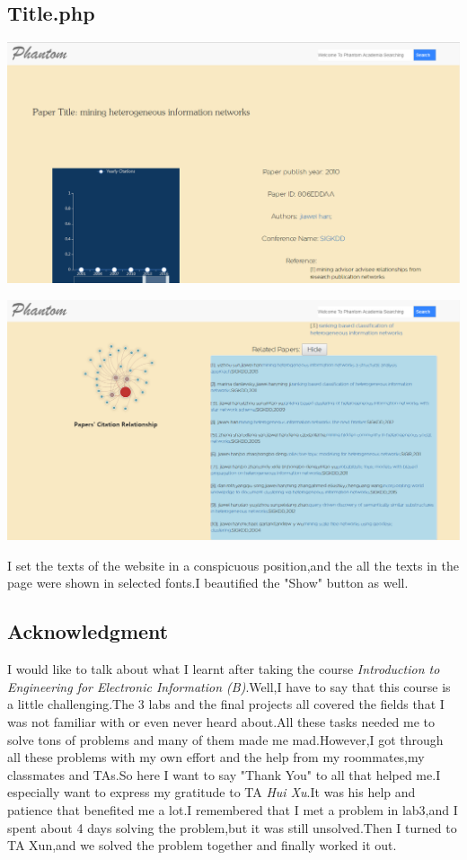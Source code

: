 \documentclass[10pt,twoside,a4paper,titlepage]{article}
\begin{document}
	\subsection{Title.php}
	\begin{flushleft}
		\includegraphics[width=1.0\textwidth]{cyf/Title1.PNG}
		\newline
		
		\includegraphics[width=1.0\textwidth]{cyf/Title2.PNG}
	\end{flushleft}

	I set the texts of the website in a conspicuous position,and the all the texts in the page were shown in selected fonts.I beautified the "Show" button as well.
	
	\subsection{Acknowledgment}
	
	I would like to talk about what I learnt after taking the course \emph{Introduction to Engineering for Electronic Information (B)}.Well,I have to say that this course is a little challenging.The 3 labs and the final projects all covered the fields that I was not familiar with or even never heard about.All these tasks needed me to solve tons of problems and many of them made me mad.However,I got through all these problems with my own effort and the help from my roommates,my classmates and TAs.So here I want to say "Thank You" to all that helped me.I especially want to express my gratitude to TA \emph{Hui Xu}.It was his help and patience that benefited me a lot.I remembered that I met a problem in lab3,and I spent about 4 days solving the problem,but it was still unsolved.Then I turned to TA Xun,and we solved the problem together and finally worked it out.
	
\end{document}
